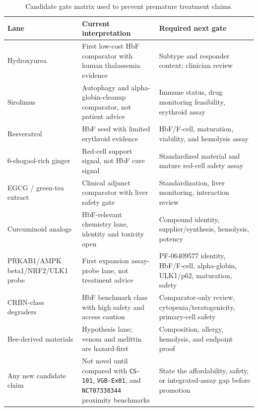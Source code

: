 \begin{table}[htbp]
\centering
\small
\caption{Candidate gate matrix used to prevent premature treatment claims.}
\label{tab:candidate-gate}
\begin{tabularx}{\textwidth}{@{}L{0.22\textwidth}Y Y@{}}
\toprule
Lane & Current interpretation & Required next gate \\
\midrule
Hydroxyurea & First low-cost HbF comparator with human thalassemia evidence &
Subtype and responder context; clinician review \\
Sirolimus & Autophagy and alpha-globin-cleanup comparator, not patient advice &
Immune status, drug monitoring feasibility, erythroid assay \\
Resveratrol & HbF seed with limited erythroid evidence & HbF/F-cell,
maturation, viability, and hemolysis assay \\
6-shogaol-rich ginger & Red-cell support signal, not HbF cure signal &
Standardized material and mature red-cell safety assay \\
EGCG / green-tea extract & Clinical adjunct comparator with liver safety gate &
Standardization, liver monitoring, interaction review \\
Curcuminoid analogs & HbF-relevant chemistry lane, identity and toxicity open &
Compound identity, supplier/synthesis, hemolysis, potency \\
PRKAB1/\allowbreak AMPK beta1/\allowbreak NRF2/\allowbreak ULK1 probe & First expansion assay-probe lane, not treatment advice &
PF-06409577 identity, HbF/F-cell, alpha-globin, ULK1/p62, maturation, safety \\
CRBN-class degraders & HbF benchmark class with high safety and access caution &
Comparator-only review, cytopenia/teratogenicity, primary-cell safety \\
Bee-derived materials & Hypothesis lane; venom and melittin are hazard-first &
Composition, allergy, hemolysis, and endpoint proof \\
Any new candidate claim & Not novel until compared with \texttt{CS-101},
\texttt{VGB-Ex01}, and \texttt{NCT07338344} proximity benchmarks & State the
affordability, safety, or integrated-assay gap before promotion \\
\bottomrule
\end{tabularx}
\end{table}
